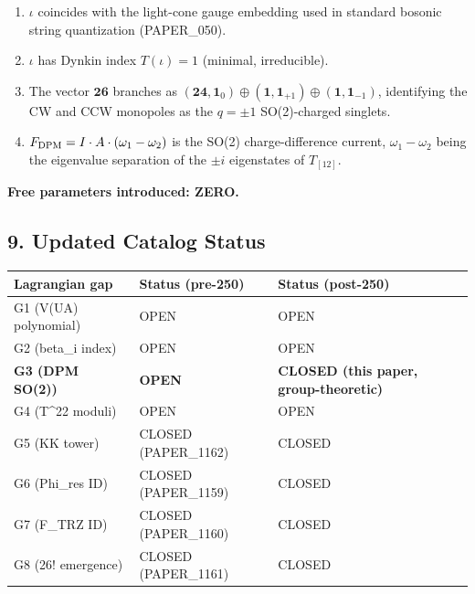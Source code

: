 \documentclass[
]{article}
\newcounter{none} %
\providecommand{\tightlist}{%
  \setlength{\itemsep}{0pt}\setlength{\parskip}{0pt}}
\begin{document}
\begin{enumerate}
\def\labelenumi{\arabic{enumi}.}
\tightlist
\item
  \(\iota\) coincides with the light-cone gauge embedding used in
  standard bosonic string quantization (PAPER\_050).
\item
  \(\iota\) has Dynkin index \(T(\iota) = 1\) (minimal, irreducible).
\item
  The vector \(\mathbf{26}\) branches as
  \((\mathbf{24},\mathbf{1}_0)\oplus(\mathbf{1},\mathbf{1}_{+1})
  \oplus(\mathbf{1},\mathbf{1}_{-1})\), identifying the CW and CCW
  monopoles as the \(q=\pm 1\) SO(2)-charged singlets.
\item
  \(F_{\rm DPM} = I\cdot A\cdot (\omega_1-\omega_2)\) is the SO(2)
  charge-difference current, \(\omega_1 - \omega_2\) being the
  eigenvalue separation of the \(\pm i\) eigenstates of \(T_{[12]}\).
\end{enumerate}

\textbf{Free parameters introduced: ZERO.}

\subsection{9. Updated Catalog Status}\label{updated-catalog-status}

{\def\LTcaptype{none} %
\begin{longtable}[]{@{}
  >{\raggedright\arraybackslash}p{}
  >{\raggedright\arraybackslash}p{}
  >{\raggedright\arraybackslash}p{}@{}}
\toprule\noalign{}
\begin{minipage}[b]{\linewidth}\raggedright
Lagrangian gap
\end{minipage} & \begin{minipage}[b]{\linewidth}\raggedright
Status (pre-250)
\end{minipage} & \begin{minipage}[b]{\linewidth}\raggedright
Status (post-250)
\end{minipage} \\
\midrule\noalign{}
\endhead
\bottomrule\noalign{}
\endlastfoot
G1 (V(UA) polynomial) & OPEN & OPEN \\
G2 (beta\_i index) & OPEN & OPEN \\
\textbf{G3 (DPM SO(2))} & \textbf{OPEN} & \textbf{CLOSED (this paper,
group-theoretic)} \\
G4 (T\^{}22 moduli) & OPEN & OPEN \\
G5 (KK tower) & CLOSED (PAPER\_1162) & CLOSED \\
G6 (Phi\_res ID) & CLOSED (PAPER\_1159) & CLOSED \\
G7 (F\_TRZ ID) & CLOSED (PAPER\_1160) & CLOSED \\
G8 (26! emergence) & CLOSED (PAPER\_1161) & CLOSED \\
\end{longtable}
}
\end{document}
